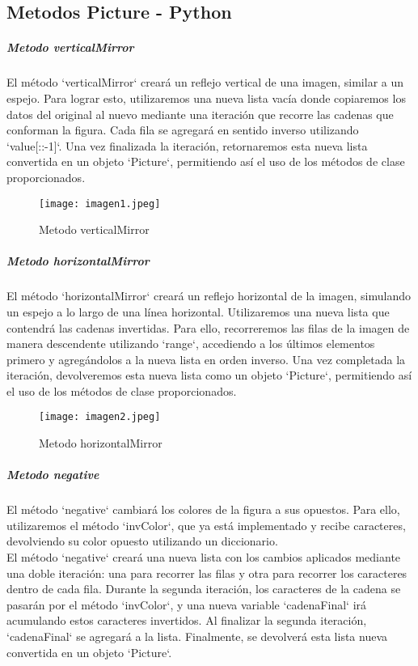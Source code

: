 \documentclass[10pt, a4paper]{article}
\begin{document}
\subsection*{Metodos Picture - Python}
	\subparagraph*{Metodo verticalMirror}
		\begin{flushleft}
			El método `verticalMirror` creará un reflejo vertical de una imagen, similar a un espejo. Para lograr esto, utilizaremos una nueva lista vacía donde copiaremos los datos del original al nuevo mediante una iteración que recorre las cadenas que conforman la figura. Cada fila se agregará en sentido inverso utilizando `value[::-1]`. Una vez finalizada la iteración, retornaremos esta nueva lista convertida en un objeto `Picture`, permitiendo así el uso de los métodos de clase proporcionados.
		\end{flushleft}
		\begin{figure}[h]
			\centering
			\texttt{[image: imagen1.jpeg]}
			\caption{Metodo verticalMirror}
		\end{figure}
	\subparagraph*{Metodo horizontalMirror}
		\begin{flushleft}
			El método `horizontalMirror` creará un reflejo horizontal de la imagen, simulando un espejo a lo largo de una línea horizontal. Utilizaremos una nueva lista que contendrá las cadenas invertidas. Para ello, recorreremos las filas de la imagen de manera descendente utilizando `range`, accediendo a los últimos elementos primero y agregándolos a la nueva lista en orden inverso. Una vez completada la iteración, devolveremos esta nueva lista como un objeto `Picture`, permitiendo así el uso de los métodos de clase proporcionados.
		\end{flushleft}
		\begin{figure}[h]
			\centering
			\texttt{[image: imagen2.jpeg]}
			\caption{Metodo horizontalMirror}
		\end{figure}
	\subparagraph*{Metodo negative}
		\begin{flushleft}
			El método `negative` cambiará los colores de la figura a sus opuestos. Para ello, utilizaremos el método `invColor`, que ya está implementado y recibe caracteres, devolviendo su color opuesto utilizando un diccionario. \\
			El método `negative` creará una nueva lista con los cambios aplicados mediante una doble iteración: una para recorrer las filas y otra para recorrer los caracteres dentro de cada fila. Durante la segunda iteración, los caracteres de la cadena se pasarán por el método `invColor`, y una nueva variable `cadenaFinal` irá acumulando estos caracteres invertidos. Al finalizar la segunda iteración, `cadenaFinal` se agregará a la lista. Finalmente, se devolverá esta lista nueva convertida en un objeto `Picture`.
		\end{flushleft}
\end{document}
